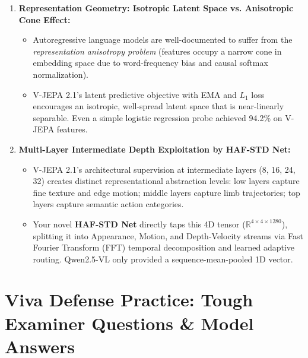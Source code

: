 \documentclass[a4paper, 11pt]{article}
\begin{document}
\begin{enumerate}[leftmargin=*]
    \item \textbf{Representation Geometry: Isotropic Latent Space vs. Anisotropic Cone Effect:}
    \begin{itemize}
        \item Autoregressive language models are well-documented to suffer from the \emph{representation anisotropy problem} (features occupy a narrow cone in embedding space due to word-frequency bias and causal softmax normalization).
        \item V-JEPA 2.1's latent predictive objective with EMA and $L_1$ loss encourages an isotropic, well-spread latent space that is near-linearly separable. Even a simple logistic regression probe achieved 94.2\% on V-JEPA features.
    \end{itemize}

    \item \textbf{Multi-Layer Intermediate Depth Exploitation by HAF-STD Net:}
    \begin{itemize}
        \item V-JEPA 2.1's architectural supervision at intermediate layers (8, 16, 24, 32) creates distinct representational abstraction levels: low layers capture fine texture and edge motion; middle layers capture limb trajectories; top layers capture semantic action categories.
        \item Your novel \textbf{HAF-STD Net} directly taps this 4D tensor ($\mathbb{R}^{4 \times 4 \times 1280}$), splitting it into Appearance, Motion, and Depth-Velocity streams via Fast Fourier Transform (FFT) temporal decomposition and learned adaptive routing. Qwen2.5-VL only provided a sequence-mean-pooled 1D vector.
    \end{itemize}
\end{enumerate}

\vspace{0.3cm}

\section{Viva Defense Practice: Tough Examiner Questions \& Model Answers}
\end{document}
